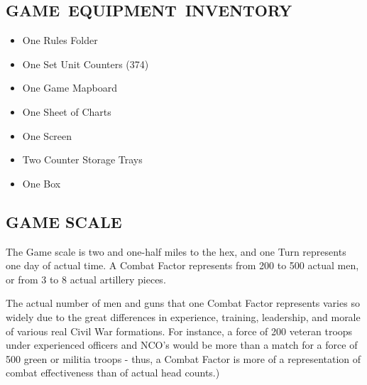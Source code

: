 \subsection[GAME EQUIPMENT INVENTORY]{\mbox{GAME EQUIPMENT INVENTORY}}

\begin{itemize}
  \setlength{\itemsep}{-0.7em}
  \item One Rules Folder
  \item One Set Unit Counters (374)
  \item One Game Mapboard
  \item One Sheet of Charts
  \item One Screen
  \item Two Counter Storage Trays
  \item One Box
\end{itemize}

\subsection{GAME SCALE}

The Game scale is two and one-half miles to the hex, and one Turn represents one day of actual time. A Combat Factor represents from 200 to 500 actual men, or from 3 to 8 actual artillery pieces.

The actual number of men and guns that one Combat Factor represents varies so widely due to the great differences in experience, training, leadership, and morale of various real Civil War formations. For instance, a force of 200 veteran troops under experienced officers and NCO's would be more than a match for a force of 500 green or militia troops - thus, a Combat Factor is more of a representation of combat effectiveness than of actual head counts.)
